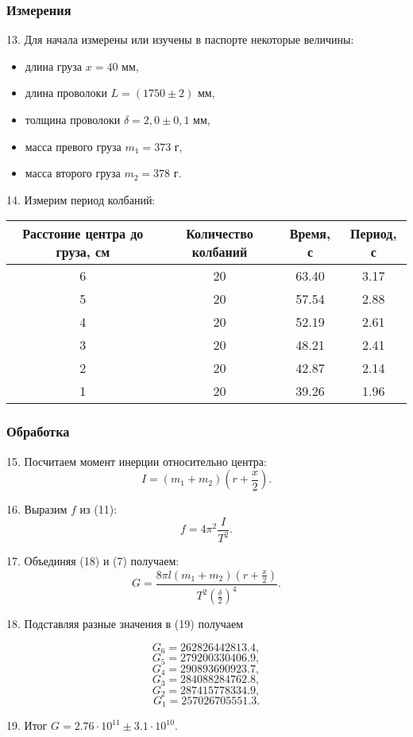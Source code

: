 \subsubsection{Измерения}
13. Для начала измерены или изучены в паспорте некоторые величины:
\begin{itemize}
    \item длина груза $x = 40$ мм,
    \item длина проволоки $L = (1750 \pm 2)$ мм,
    \item толщина проволоки $\delta = 2,0 \pm 0,1$ мм,
    \item масса превого груза $m_1 = 373$ г,
    \item масса второго груза $m_2 = 378$ г.
\end{itemize}

14. Измерим период колбаний:

\begin{tabular*}{0.915\textwidth}{|c|c|c|c|}
    \hline
    Расстоние центра до груза, см & Количество колбаний & Время, с & Период, с\\
    \hline
    6 & 20 & 63.40 & 3.17\\
    \hline
    5 & 20 & 57.54 & 2.88\\
    \hline
    4 & 20 & 52.19 & 2.61\\
    \hline
    3 & 20 & 48.21 & 2.41\\
    \hline
    2 & 20 & 42.87 & 2.14\\
    \hline
    1 & 20 & 39.26 & 1.96\\
    \hline

\end{tabular*}
\subsubsection{Обработка}
15. Посчитаем момент инерции относительно центра:
\begin{equation}
    I = (m_1 + m_2)(r + \frac x2).
\end{equation}

16. Выразим $f$ из (11):
\begin{equation}
f = 4\pi^2\frac I {T^2}.
\end{equation}

17. Объединяя (18) и (7) получаем:
\begin{equation}
    G = \frac{8\pi l\left(m_1 + m_2\right)\left(r + \frac x2\right)}{T^2\left(\frac{\delta}{2}\right)^4}.
\end{equation}

18. Подставляя разные значения в (19) получаем

\[G_6 = 262826442813.4,\]
\[G_5 = 279200330406.9,\]
\[G_4 = 290893690923.7,\]
\[G_3 = 284088284762.8,\]
\[G_2 = 287415778334.9,\]
\[G_1 = 257026705551.3.\]

19. Итог $G = 2.76 \cdot 10^{11} \pm 3.1 \cdot 10^{10}$.
